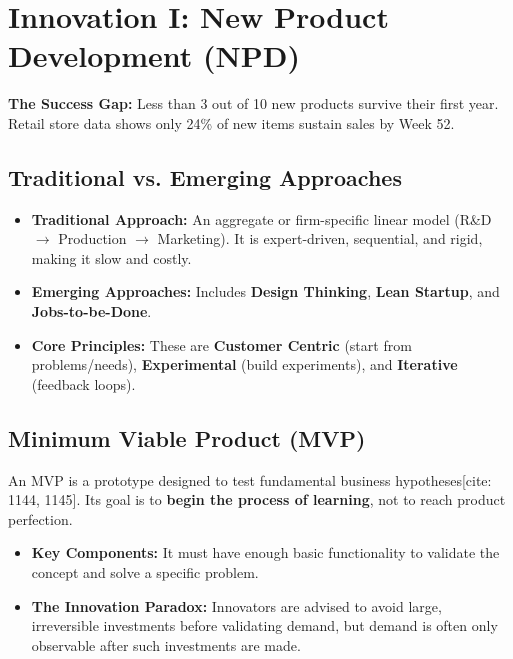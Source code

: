 \section{Innovation I: New Product Development (NPD)}
\textbf{The Success Gap:} Less than 3 out of 10 new products survive their first year.
Retail store data shows only 24\% of new items sustain sales by Week 52.

\subsection{Traditional vs. Emerging Approaches}
\begin{itemize}
    \item \textbf{Traditional Approach:} An aggregate or firm-specific linear model (R\&D
          $\rightarrow$ Production $\rightarrow$ Marketing). It is expert-driven,
          sequential, and rigid, making it slow and costly.
    \item \textbf{Emerging Approaches:} Includes \textbf{Design Thinking}, \textbf{Lean Startup}, and \textbf{Jobs-to-be-Done}.
    \item \textbf{Core Principles:} These are \textbf{Customer Centric} (start from problems/needs), \textbf{Experimental} (build experiments), and \textbf{Iterative} (feedback loops).
\end{itemize}

\subsection{Minimum Viable Product (MVP)}

An MVP is a prototype designed to test fundamental business hypotheses[cite:
        1144, 1145]. Its goal is to \textbf{begin the process of learning}, not to reach product perfection.
\begin{itemize}
    \item \textbf{Key Components:} It must have enough basic functionality to validate the
          concept and solve a specific problem.
    \item \textbf{The Innovation Paradox:} Innovators are advised to avoid large, irreversible
          investments before validating demand, but demand is often only observable after
          such investments are made.
\end{itemize}

